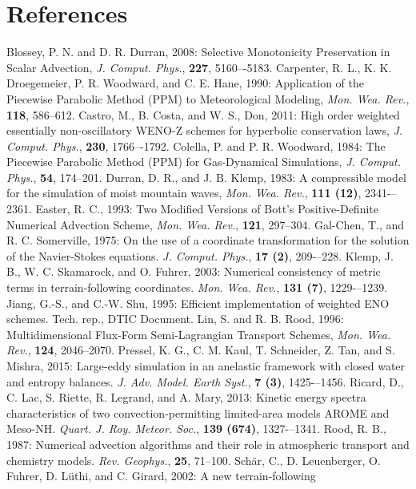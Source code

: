 \section{References}
\decrefname
Blossey, P. N. and D. R. Durran, 2008: Selective Monotonicity
   Preservation in Scalar Advection, 
   {\it J. Comput. Phys.},  {\bf 227}, 5160–-5183. 
\decrefname
Carpenter, R. L., K. K. Droegemeier,
   P. R. Woodward, and C. E. Hane, 1990: Application of the
   Piecewise Parabolic Method (PPM) to Meteorological Modeling,
  {\it Mon. Wea. Rev.},  {\bf 118}, 586--612.
\decrefname
Castro, M., B. Costa, and W. S., Don, 2011: High order weighted
   essentially non-oscillatory WENO-Z schemes for hyperbolic conservation laws,
   {\it J. Comput. Phys.},  {\bf 230}, 1766–-1792. 
\decrefname
Colella, P. and P. R. Woodward, 1984: The
   Piecewise Parabolic Method (PPM) for Gas-Dynamical Simulations,
   {\it J. Comput. Phys.},  {\bf 54}, 174--201.
\decrefname
Durran, D. R., and J. B. Klemp, 1983: A compressible model for
   the simulation of moist mountain waves,
   {\it Mon. Wea. Rev.},  {\bf 111 (12)}, 2341-–2361.
\decrefname
Easter, R. C., 1993: Two Modified Versions of Bott's Positive-Definite
   Numerical Advection Scheme, {\it Mon. Wea. Rev.},  {\bf 121}, 297--304.
\decrefname
Gal-Chen, T., and R. C. Somerville, 1975: On the use of a coordinate transformation for the
solution of the Navier-Stokes equations. {\it J. Comput. Phys.},  {\bf 17 (2)}, 209-–228.
\decrefname
Klemp, J. B., W. C. Skamarock, and O. Fuhrer, 2003: Numerical consistency of metric terms in
terrain-following coordinates. {\it Mon. Wea. Rev.}, {\bf 131 (7)}, 1229-–1239.
\decrefname
Jiang, G.-S., and C.-W. Shu, 1995: Efficient implementation of weighted ENO schemes. Tech. rep.,
DTIC Document.
\decrefname
Lin, S. and R. B. Rood, 1996: Multidimensional Flux-Form
   Semi-Lagrangian Transport Schemes, 
   {\it Mon. Wea. Rev.}, {\bf 124}, 2046--2070.
\decrefname
Pressel, K. G., C. M. Kaul, T. Schneider, Z. Tan, and S. Mishra, 2015:
   Large-eddy simulation in an anelastic framework with closed water and entropy
   balances. {\it J. Adv. Model. Earth Syst.}, {\bf 7 (3)}, 1425-–1456.
\decrefname
Ricard, D., C. Lac, S. Riette, R. Legrand, and A. Mary, 2013: Kinetic energy spectra characteristics
of two convection-permitting limited-area models AROME and Meso-NH. {\it Quart. J. Roy. Meteor. Soc.}, {\bf
139 (674)}, 1327-–1341.
\decrefname
Rood, R. B., 1987: Numerical advection algorithms and their role in
   atmospheric transport and chemistry models.
   {\it Rev. Geophys.}, {\bf 25}, 71--100.
\decrefname
Sch\"ar, C., D. Leuenberger, O. Fuhrer, D. L\"uthi, and C. Girard, 2002: A new terrain-following
